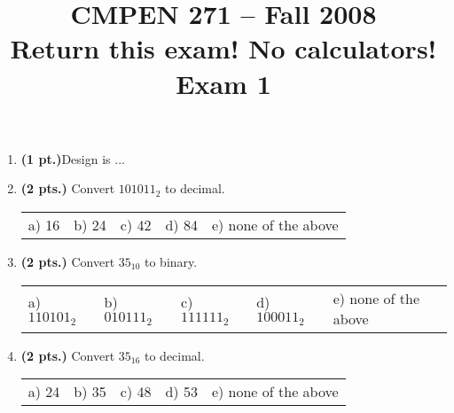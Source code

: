 \documentclass{article}
\begin{document}
\newcommand{\SOPmin}{${\rm SOP}_{\rm min} \ $}
\newcommand{\POSmin}{${\rm POS}_{\rm min} \ $}
\newcommand{\bs}{\backslash}


\title{
\Huge{CMPEN 271 -- Fall 2008}\\
\normalsize{Return this exam!  No calculators!}\\
\normalsize{Exam 1}\\
 }
\date{}

\maketitle{}


\begin{enumerate}
\item {\bf (1 pt.)}Design is ...

\item {\bf (2 pts.)} Convert $101011_2$ to decimal.

\begin{tabular}{p{0.7in} p{0.7in} p{0.7in} p{0.7in} l}
a) 16 & b) 24 & c) 42 & d) 84 & e) none of the above
\end{tabular}

\item {\bf (2 pts.)} Convert $35_{10}$ to binary.

\begin{tabular}{p{0.7in} p{0.7in} p{0.7in} p{0.7in} l}
a) $110101_2$ & b) $010111_2$ & c) $111111_2$ & d) $100011_2$ & e) none of the above
\end{tabular}

\item {\bf (2 pts.)} Convert $35_{16}$ to decimal.

\begin{tabular}{p{0.7in} p{0.7in} p{0.7in} p{0.7in} l}
a) 24 & b) 35 & c) 48 & d) 53 & e) none of the above
\end{tabular}


\end{enumerate}
\end{document}
